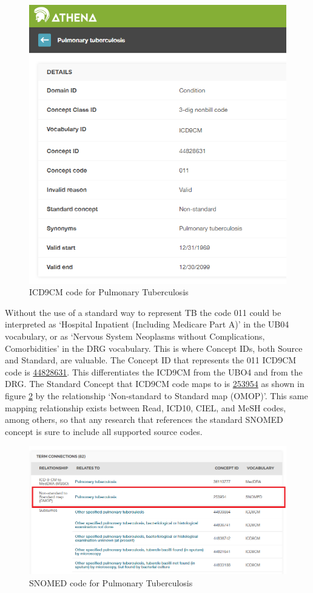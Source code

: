 \documentclass[11pt]{book}
\begin{document}
\begin{figure}

{\centering \includegraphics[width=0.75\linewidth]{images/CommonDataModel/pulmTubICD9} 

}

\caption{ICD9CM code for Pulmonary Tuberculosis}\label{fig:pulmTubICD9}
\end{figure}

Without the use of a standard way to represent TB the code 011 could be
interpreted as `Hospital Inpatient (Including Medicare Part A)' in the
UB04 vocabulary, or as `Nervous System Neoplasms without Complications,
Comorbidities' in the DRG vocabulary. This is where Concept IDs, both
Source and Standard, are valuable. The Concept ID that represents the
011 ICD9CM code is
\href{http://athena.ohdsi.org/search-terms/terms/44828631}{44828631}.
This differentiates the ICD9CM from the UBO4 and from the DRG. The
Standard Concept that ICD9CM code maps to is
\href{http://athena.ohdsi.org/search-terms/terms/253954}{253954} as
shown in figure \ref{fig:pulmTubMap} by the relationship `Non-standard
to Standard map (OMOP)'. This same mapping relationship exists between
Read, ICD10, CIEL, and MeSH codes, among others, so that any research
that references the standard SNOMED concept is sure to include all
supported source codes.

\begin{figure}
\includegraphics[width=1\linewidth]{images/CommonDataModel/pulmTubMap} \caption{SNOMED code for Pulmonary Tuberculosis}\label{fig:pulmTubMap}
\end{figure}
\end{document}
